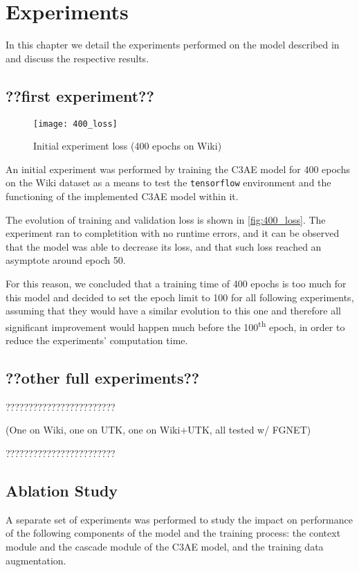
\chapter{Experiments}
In this chapter we detail the experiments performed on the model described in
 and discuss the respective results.

\section{??first experiment??}

\begin{wrapfigure}[17]{r}{0.5\textwidth}
    \centering
    \texttt{[image: 400\_loss]}
    \caption{Initial experiment loss (400 epochs on Wiki)}
    \label{fig:400_loss}
\end{wrapfigure}

An initial experiment was performed by training the C3AE model for
400 epochs on the Wiki dataset as a means to test the \texttt{tensorflow} environment
and the functioning of the implemented C3AE model within it.

The evolution of training and validation loss is shown in \autoref{fig:400_loss}.
The experiment ran to completition with no runtime errors, and
it can be observed that the model was able to decrease its loss,
and that such loss reached an asymptote around epoch 50.

For this reason, we concluded that a training time of 400 epochs
is too much for this model and decided to set the epoch limit to 100 for
all following experiments, assuming that they would have a similar
evolution to this one and therefore all significant improvement
would happen much before the 100\textsuperscript{th} epoch,
in order to reduce the experiments' computation time.

\section{??other full experiments??}
????????????????????????

(One on Wiki, one on UTK, one on Wiki+UTK, all tested w/ FGNET)

????????????????????????

\section{Ablation Study}
A separate set of experiments was performed to study the impact on performance
of the following components of the model and the training process:
the context module and the cascade module of the C3AE model,
and the training data augmentation.


